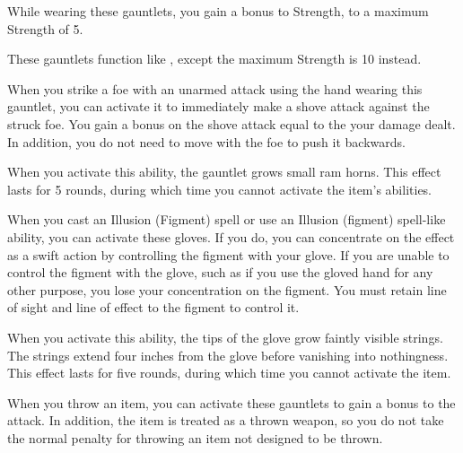 
 While wearing these gauntlets, you gain a  bonus to Strength, to a maximum Strength of 5.


 These gauntlets function like , except the maximum Strength is 10 instead.


 When you strike a foe with an unarmed attack using the hand wearing this gauntlet, you can activate it to immediately make a shove attack against the struck foe.
You gain a bonus on the shove attack equal to the your damage dealt.
In addition, you do not need to move with the foe to push it backwards.

When you activate this ability, the gauntlet grows small ram horns.
This effect lasts for 5 rounds, during which time you cannot activate the item's abilities.


 When you cast an Illusion (Figment) spell or use an Illusion (figment) spell-like ability, you can activate these gloves.
If you do, you can concentrate on the effect as a swift action by controlling the figment with your glove.
If you are unable to control the figment with the glove, such as if you use the gloved hand for any other purpose, you lose your concentration on the figment.
You must retain line of sight and line of effect to the figment to control it.

When you activate this ability, the tips of the glove grow faintly visible strings.
The strings extend four inches from the glove before vanishing into nothingness.
This effect lasts for five rounds, during which time you cannot activate the item.


 When you throw an item, you can activate these gauntlets to gain a  bonus to the attack.
In addition, the item is treated as a thrown weapon, so you do not take the normal  penalty for throwing an item not designed to be thrown.

